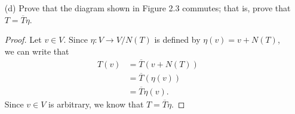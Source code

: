 \begin{enumerate}
\begin{proof}
            Now, we will show that \( \overline{T}  \) is a surjective map. Since \( T  \) is a linear transformation from \( V  \) onto \( Z  \), we know that any arbitrary \( y \in Z  \) can be written as \( T(x) = y  \) for some \( x \in V  \). By definition of \( \overline{T} \), we have
            \[  y = T(x) = \overline{T}(x + N(T)) \] where \( x + N(T) \in V / N(T) \).
            Hence, \( \overline{T} \) is a surjective linear map. Thus, \( \overline{T} \) is an isomorphism.
        \end{proof}
    \item[(d)] Prove that the diagram shown in Figure 2.3 commutes; that is, prove that \( T = \overline{T} \eta \).
        \begin{proof}
        Let \( v \in V  \). Since \( \eta: V \to V / N(T) \) is defined by \( \eta(v) = v + N(T) \), we can write that
        \begin{align*}
            T(v) &= \overline{T}(v + N(T)) \\
                 &= \overline{T}(\eta(v)) \\
                 &= \overline{T}\eta(v).
        \end{align*}
        Since \( v \in V  \) is arbitrary, we know that \( T = \overline{T}\eta \).
        \end{proof}
\end{enumerate}


